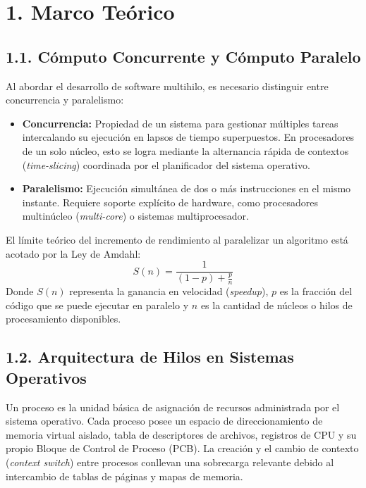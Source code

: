 \documentclass{article}
\begin{document}

\section*{1. Marco Teórico}

\subsection*{1.1. Cómputo Concurrente y Cómputo Paralelo}
Al abordar el desarrollo de software multihilo, es necesario distinguir entre concurrencia y paralelismo:
\begin{itemize}
    \item \textbf{Concurrencia:} Propiedad de un sistema para gestionar múltiples tareas intercalando su ejecución en lapsos de tiempo superpuestos. En procesadores de un solo núcleo, esto se logra mediante la alternancia rápida de contextos (\textit{time-slicing}) coordinada por el planificador del sistema operativo.
    \item \textbf{Paralelismo:} Ejecución simultánea de dos o más instrucciones en el mismo instante. Requiere soporte explícito de hardware, como procesadores multinúcleo (\textit{multi-core}) o sistemas multiprocesador.
\end{itemize}

El límite teórico del incremento de rendimiento al paralelizar un algoritmo está acotado por la Ley de Amdahl:
\[
S(n) = \frac{1}{(1 - p) + \frac{p}{n}}
\]
Donde \(S(n)\) representa la ganancia en velocidad (\textit{speedup}), \(p\) es la fracción del código que se puede ejecutar en paralelo y \(n\) es la cantidad de núcleos o hilos de procesamiento disponibles.

\subsection*{1.2. Arquitectura de Hilos en Sistemas Operativos}
Un proceso es la unidad básica de asignación de recursos administrada por el sistema operativo. Cada proceso posee un espacio de direccionamiento de memoria virtual aislado, tabla de descriptores de archivos, registros de CPU y su propio Bloque de Control de Proceso (PCB). La creación y el cambio de contexto (\textit{context switch}) entre procesos conllevan una sobrecarga relevante debido al intercambio de tablas de páginas y mapas de memoria.
\end{document}
